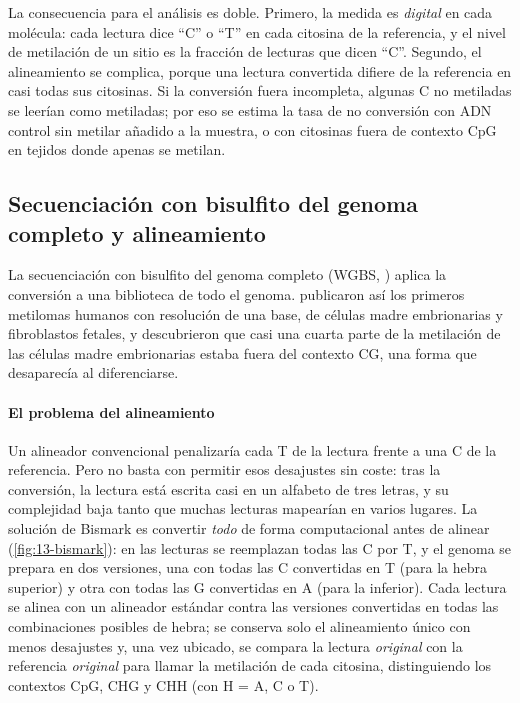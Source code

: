 La consecuencia para el análisis es doble. Primero, la medida es \emph{digital} en cada molécula: cada lectura dice ``C'' o ``T'' en cada citosina de la referencia, y el nivel de metilación de un sitio es la fracción de lecturas que dicen ``C''. Segundo, el alineamiento se complica, porque una lectura convertida difiere de la referencia en casi todas sus citosinas. Si la conversión fuera incompleta, algunas C no metiladas se leerían como metiladas; por eso se estima la tasa de no conversión con ADN control sin metilar añadido a la muestra, o con citosinas fuera de contexto CpG en tejidos donde apenas se metilan.

\subsection{Secuenciación con bisulfito del genoma completo y alineamiento}

La secuenciación con bisulfito del genoma completo (WGBS, ) aplica la conversión a una biblioteca de todo el genoma. \textcite{c13-lister2009} publicaron así los primeros metilomas humanos con resolución de una base, de células madre embrionarias y fibroblastos fetales, y descubrieron que casi una cuarta parte de la metilación de las células madre embrionarias estaba fuera del contexto CG, una forma que desaparecía al diferenciarse.

\paragraph{El problema del alineamiento} Un alineador convencional penalizaría cada T de la lectura frente a una C de la referencia. Pero no basta con permitir esos desajustes sin coste: tras la conversión, la lectura está escrita casi en un alfabeto de tres letras, y su complejidad baja tanto que muchas lecturas mapearían en varios lugares. La solución de Bismark \parencite{c13-krueger2011} es convertir \emph{todo} de forma computacional antes de alinear (\cref{fig:13-bismark}): en las lecturas se reemplazan todas las C por T, y el genoma se prepara en dos versiones, una con todas las C convertidas en T (para la hebra superior) y otra con todas las G convertidas en A (para la inferior). Cada lectura se alinea con un alineador estándar contra las versiones convertidas en todas las combinaciones posibles de hebra; se conserva solo el alineamiento único con menos desajustes y, una vez ubicado, se compara la lectura \emph{original} con la referencia \emph{original} para llamar la metilación de cada citosina, distinguiendo los contextos CpG, CHG y CHH (con H = A, C o T).

